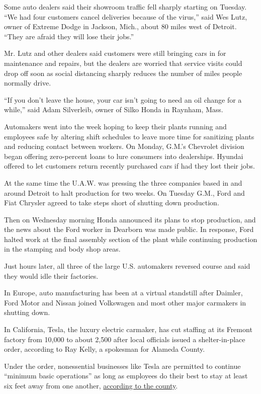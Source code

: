 Some auto dealers said their showroom traffic fell sharply starting on
Tuesday. ``We had four customers cancel deliveries because of the
virus,'' said Wes Lutz, owner of Extreme Dodge in Jackson, Mich., about
80 miles west of Detroit. ``They are afraid they will lose their jobs.''

Mr. Lutz and other dealers said customers were still bringing cars in
for maintenance and repairs, but the dealers are worried that service
visits could drop off soon as social distancing sharply reduces the
number of miles people normally drive.

``If you don't leave the house, your car isn't going to need an oil
change for a while,'' said Adam Silverleib, owner of Silko Honda in
Raynham, Mass.

Automakers went into the week hoping to keep their plants running and
employees safe by altering shift schedules to leave more time for
sanitizing plants and reducing contact between workers. On Monday,
G.M.'s Chevrolet division began offering zero-percent loans to lure
consumers into dealerships. Hyundai offered to let customers return
recently purchased cars if had they lost their jobs.

At the same time the U.A.W. was pressing the three companies based in
and around Detroit to halt production for two weeks. On Tuesday G.M.,
Ford and Fiat Chrysler agreed to take steps short of shutting down
production.

Then on Wednesday morning Honda announced its plans to stop production,
and the news about the Ford worker in Dearborn was made public. In
response, Ford halted work at the final assembly section of the plant
while continuing production in the stamping and body shop areas.

Just hours later, all three of the large U.S. automakers reversed course
and said they would idle their factories.

In Europe, auto manufacturing has been at a virtual standstill after
Daimler, Ford Motor and Nissan joined Volkswagen and most other major
carmakers in shutting down.

In California, Tesla, the luxury electric carmaker, has cut staffing at
its Fremont factory from 10,000 to about 2,500 after local officials
issued a shelter-in-place order, according to Ray Kelly, a spokesman for
Alameda County.

Under the order, nonessential businesses like Tesla are permitted to
continue ``minimum basic operations'' as long as employees do their best
to stay at least six feet away from one another,
\href{http://www.acphd.org/media/559828/faqs-order-shelter-in-place-20200316.pdf}{according
to the county}.


